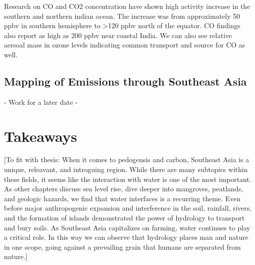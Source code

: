 Research on CO and CO2 concentration have shown high activity increase in the southern and northern indian ocean. The increase was from approximately 50 ppbv in southern hemisphere to >120 ppbv north of the equator. CO findings also report as high as 200 ppbv near coastal India. We can also see relative aersoal mass in ozone levels indicating common transport and source for CO as well. \citep{phadnis2002evolution}

\subsection {Mapping of Emissions through Southeast Asia}
- Work for a later date -

\section{Takeaways}
[To fit with thesis: When it comes to pedogensis and carbon, Southeast Asia is a unique, releavant, and introguing region. While there are many subtopics within these fields, it seems like the interaction with water is one of the most important. As other chapters discuss sea level rise, dive deeper into mangroves, peatlands, and geologic hazards, we find that water interfaces is a recurring theme. Even before major anthropogenic expansion and interference in the soil, rainfall, rivers, and the formation of islands demonstrated the power of hydrology to transport and bury soils. As Southeast Asia capitalizes on farming, water continues to play a critical role. In this way we can observe that hydrology places man and nature in one scope, going against a prevailing grain that humans are separated from nature.]
